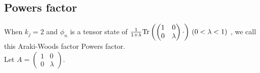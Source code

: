 \subsection{Powers factor}

When $k_j=2$ and $\phi_n$ is a tensor state of $\frac{1}{1+\lambda}{\rm Tr}\left(\begin{pmatrix} 1 & 0 \\ 0 & \lambda \end{pmatrix} \cdot \right) \, (0 < \lambda < 1)$ , we call this Araki-Woods factor Powers factor. \\
Let $A = \begin{pmatrix} 1 & 0 \\ 0 & \lambda \end{pmatrix}$.
